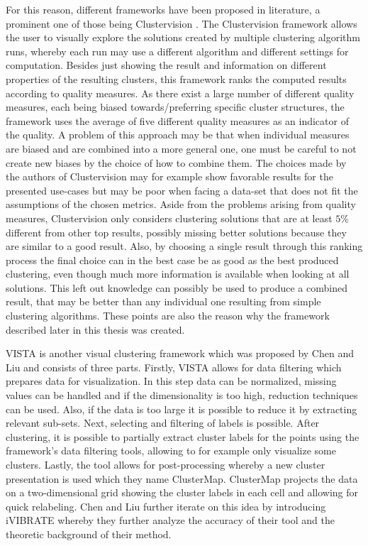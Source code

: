 \documentclass[
	a4paper,
	english,
	twoside,
	openright,               
	11pt                            
	]{report}
\begin{document}
For this reason, different frameworks have been proposed in literature, a prominent one of those being Clustervision \cite{Kwon2018ClustervisionVS}. The Clustervision framework allows the user to visually explore the solutions created by multiple clustering algorithm runs, whereby each run may use a different algorithm and different settings for computation. Besides just showing the result and information on different properties of the resulting clusters, this framework ranks the computed results according to quality measures. As there exist a large number of different quality measures, each being biased towards/preferring specific cluster structures, the framework uses the average of five different quality measures as an indicator of the quality. A problem of this approach may be that when individual measures are biased and are combined into a more general one, one must be careful to not create new biases by the choice of how to combine them. The choices made by the authors of Clustervision \cite{Kwon2018ClustervisionVS} may for example show favorable results for the presented use-cases but may be poor when facing a data-set that does not fit the assumptions of the chosen metrics. Aside from the problems arising from quality measures, Clustervision only considers clustering solutions that are at least $5\%$ different from other top results, possibly missing better solutions because they are similar to a good result. Also, by choosing a single result through this ranking process the final choice can in the best case be as good as the best produced clustering, even though much more information is available when looking at all solutions. This left out knowledge can possibly be used to produce a combined result, that may be better than any individual one resulting from simple clustering algorithms. These points are also the reason why the framework described later in this thesis was created.

VISTA \cite{VISTA} is another visual clustering framework which was proposed by Chen and Liu and consists of three parts. Firstly, VISTA allows for data filtering which prepares data for visualization. In this step data can be normalized, missing values can be handled and if the dimensionality is too high, reduction techniques can be used. Also, if the data is too large it is possible to reduce it by extracting relevant sub-sets. Next, selecting and filtering of labels is possible. After clustering, it is possible to partially extract cluster labels for the points using the framework's data filtering tools, allowing to for example only visualize some clusters. Lastly, the tool allows for post-processing whereby a new cluster presentation is used which they name ClusterMap. ClusterMap projects the data on a two-dimensional grid showing the cluster labels in each cell and allowing for quick relabeling. Chen and Liu further iterate on this idea by introducing iVIBRATE \cite{10.1145/1148020.1148024} whereby they further analyze the accuracy of their tool and the theoretic background of their method.
\end{document}
